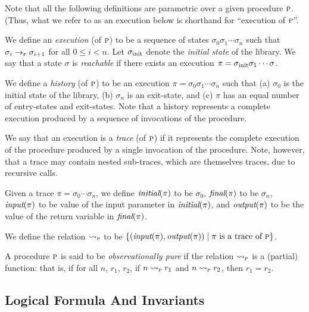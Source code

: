 Note that all the following definitions are parametric over a given procedure $\textsc{p}$.
(Thus, what we refer to as an execution below is shorthand for ``execution of $\textsc{p}$''.

We define an \emph{execution} (of $\textsc{p}$) to be a sequence of states $\sigma_0 \sigma_1 \cdots \sigma_n$ such that
$\sigma_i \rightarrow_{\textsc{p}} \sigma_{i+1}$ for all $0 \leq i < n$.
Let $\sigma_{\text{init}}$ denote the \emph{initial state} of the library.
We say that a state $\sigma$ is \emph{ reachable} if there exists an execution $\pi = \sigma_{\text{init}} \sigma_1 \cdots \sigma$.

We define a \emph{history} (of $\textsc{p}$) to be an execution $\pi = \sigma_0 \sigma_1 \cdots \sigma_n$ such that
(a) $\sigma_0$ is the initial state of the library,
(b) $\sigma_n$ is an exit-state, and
(c) $\pi$ has an equal number of entry-states and exit-states.
Note that a history represents a complete  execution produced by a
sequence of invocations of the procedure.

We say that an execution is a \emph{trace} (of $\textsc{p}$) if it represents the complete execution
of the procedure produced by a single invocation of the procedure.
Note, however, that a trace may contain nested sub-traces,
which are themselves traces, due to recursive calls.

Given a trace $\pi = \sigma_0 \cdots \sigma_n$, we define
$\textit{initial}(\pi)$ to be $\sigma_0$,
$\textit{final}(\pi)$ to be $\sigma_n$,
$\textit{input}(\pi)$ to be value of the input parameter in $\textit{initial}(\pi)$,
and $\textit{output}(\pi)$ to be the value of the return variable in $\textit{final}(\pi)$.

We define the relation $\rightsquigarrow_{\textsc{p}}$ to be $\{ (\textit{input}(\pi),\textit{output}(\pi)) \; | \; \pi \text{ is a trace of } \textsc{p} \}$.

\begin{definition}
A procedure $\textsc{p}$ is said to be \emph{observationally pure} if the relation $\rightsquigarrow_{\textsc{p}}$ is a (partial) function:
that is, if for all $n$, $r_1$, $r_2$, if  $n \rightsquigarrow_{\textsc{p}} r_1$ and $n \rightsquigarrow_{\textsc{p}} r_2$, then $r_1 = r_2$.
\end{definition}

\subsection*{Logical Formula And Invariants}

